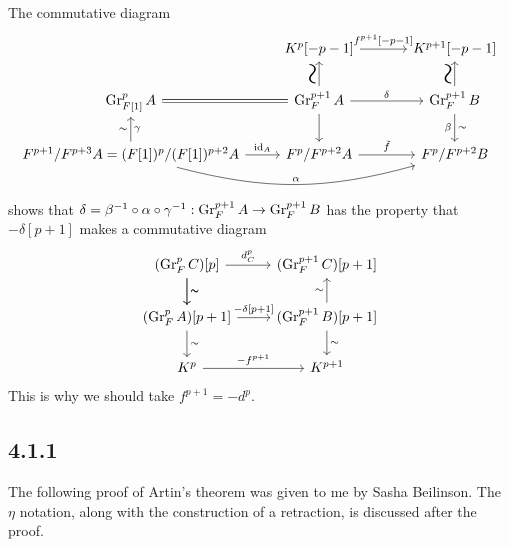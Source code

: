 \documentclass[deligne.tex]{subfiles}
\begin{document}
The commutative diagram
\begin{equation*}\begin{tikzcd}
	&K^p[-p-1]\arrow[r,"{f^{p+1}[-p-1]}"]
	&[10pt]K^{p+1}[-p-1] \\
	\Gr^p_{F[1]}A\arrow[r,equals]
	&\Gr_F^{p+1}A\arrow[r,"\delta"]\arrow[d]\arrow[u,"{\rotatebox{-90}{\text{\Huge$\sim$}}}"]
	&\Gr_F^{p+1}B\arrow[d,"\sim","\beta"']\arrow[u,"{\rotatebox{-90}{\text{\Huge$\sim$}}}"] \\
	F^{p+1}/F^{p+3}A=(F[1])^p/(F[1])^{p+2}A\arrow[u,"\sim","\gamma"']\arrow[r,"\id_A"]\arrow[rr,bend right=15,"\alpha"]
	&F^p/F^{p+2}A\arrow[r,"\tilde f"]&F^p/F^{p+2}B
\end{tikzcd}\end{equation*}
shows that
$\delta=\beta^{-1}\circ\alpha\circ\gamma^{-1}:\operatorname{Gr}_F^{p+1}A\rightarrow\operatorname{Gr}_F^{p+1}B$
has the property that $-\delta[p+1]$ makes a commutative diagram
\begin{equation*}\begin{tikzcd}
	(\Gr_F^{p}C)[p]\arrow[d,"\sim"]\arrow[r,"d_C^p"]\arrow[d,"\sim"]
	&(\Gr_F^{p+1}C)[p+1] \\
	(\Gr_F^{p}A)[p+1]\arrow[d,"\sim"]\arrow[r,"{-\delta[p+1]}"]
	&(\Gr_F^{p+1}B)[p+1]\arrow[d,"\sim"]\arrow[u,"\sim"] \\
	K^p\arrow[r,"-f^{p+1}"]&K^{p+1}
\end{tikzcd}\end{equation*}
This is why we should take $f^{p+1}=-d^p$.





\subsection*{4.1.1} The following proof of Artin's theorem was given to me
by Sasha Beilinson. The $\eta$ notation, along with the
construction of a retraction, is discussed after the proof.
\end{document}
